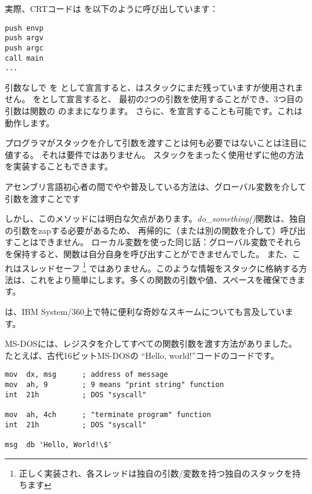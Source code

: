 実際、\ac{CRT}コードは \main を以下のように呼び出しています：
	
\begin{lstlisting}[style=customasmx86]
push envp
push argv
push argc
call main
...
\end{lstlisting}

引数なしで \main を \main として宣言すると、\main はスタックにまだ残っていますが使用されません。 
\main をとして宣言すると、
最初の2つの引数を使用することができ、3つ目の引数は関数の のままになります。 
さらに、を宣言することも可能です。これは動作します。


プログラマがスタックを介して引数を渡すことは何も必要ではないことは注目に値する。
それは要件ではありません。 スタックをまったく使用せずに他の方法を実装することもできます。

アセンブリ言語初心者の間でやや普及している方法は、グローバル変数を介して引数を渡すことです



しかし、このメソッドには明白な欠点があります。\emph{do\_something()}関数は、独自の引数をzapする必要があるため、
再帰的に（または別の関数を介して）呼び出すことはできません。 
ローカル変数を使った同じ話：グローバル変数でそれらを保持すると、関数は自分自身を呼び出すことができませんでした。 
また、これはスレッドセーフ
\footnote{正しく実装され、各スレッドは独自の引数/変数を持つ独自のスタックを持ちます}
ではありません。このような情報をスタックに格納する方法は、これをより簡単にします。多くの関数の引数や値、スペースを確保できます。

は、IBM System/360上で特に便利な奇妙なスキームについても言及しています。


MS-DOSには、レジスタを介してすべての関数引数を渡す方法がありました。
たとえば、古代16ビットMS-DOSの ``Hello, world!''コードのコードです。

\begin{lstlisting}[style=customasmx86]
mov  dx, msg      ; address of message
mov  ah, 9        ; 9 means "print string" function
int  21h          ; DOS "syscall"

mov  ah, 4ch      ; "terminate program" function
int  21h          ; DOS "syscall"

msg  db 'Hello, World!\$'
\end{lstlisting}

